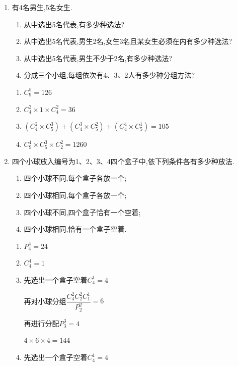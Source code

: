 \begin{enumerate}
\item 有4名男生,5名女生.
\begin{enumerate}
    \item 从中选出5名代表,有多少种选法?
    \item 从中选出5名代表,男生2名,女生3名且某女生必须在内有多少种选法?
    \item 从中选出5名代表,男生不少于2名,有多少种选法?
    \item 分成三个小组,每组依次有4、3、2人有多少种分组方法?
\end{enumerate}
\begin{jieda}
    \begin{enumerate}
        \item ${C}_{9}^{5} = {126}$
        \item $ {C}_{4}^{2} \times  1 \times  {C}_{4}^{2} = {36}$
        \item $\left( {{C}_{4}^{2} \times  {C}_{5}^{3}}\right)  + \left( {{C}_{4}^{3} \times  {C}_{5}^{2}}\right)  + \left( {{C}_{4}^{4} \times  {C}_{5}^{1}}\right)  = {105}$
        \item ${C}_{9}^{4} \times  {C}_{5}^{3} \times  {C}_{2}^{2} = {1260}$
    \end{enumerate}
\end{jieda}

\item 四个小球放入编号为1、2、3、4四个盒子中,依下列条件各有多少种放法.
\begin{enumerate}
    \item 四个小球不同,每个盒子各放一个;
    \item 四个小球相同,每个盒子各放一个;
    \item 四个小球不同,四个盒子恰有一个空着;
    \item 四个小球相同,恰有一个盒子空着.
\end{enumerate}
\begin{jieda}
    \begin{enumerate}
        \item $P_4^4 = 24$
        \item $C_4^4 = 1$
        \item 先选出一个盒子空着$C_4^1 = 4$

        再对小球分组$\dfrac{C_4^2C_2^2C_1^1}{P_2^2} = 6$

        再进行分配$P_3^3 = 4$

        $4 \times 6 \times 4 = 144$
        \item 先选出一个盒子空着$C_4^1 = 4$


\end{enumerate}
\end{jieda}
\end{enumerate}
